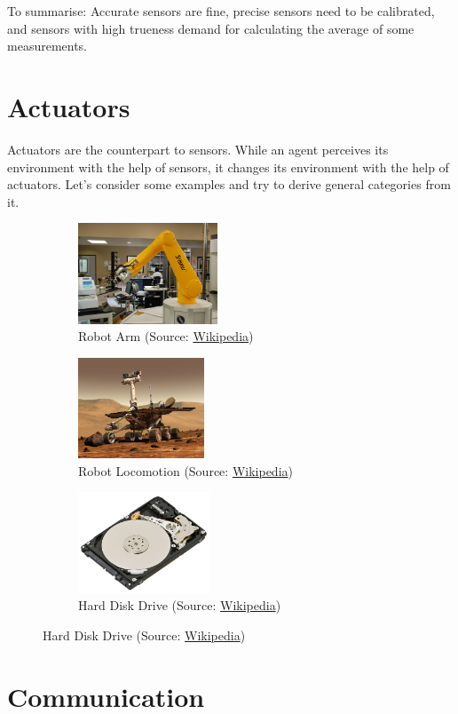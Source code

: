 To summarise: Accurate sensors are fine, precise sensors need to be calibrated, and sensors with high trueness demand for calculating the average of some measurements.

\section{Actuators}
\label{sec:actuators}

Actuators are the counterpart to sensors. While an agent perceives its environment with the help of sensors, it changes its environment with the help of actuators. Let's consider some examples and try to derive general categories from it.

\begin{figure}[htbp]
 \begin{subfigure}[b]{0.3\textwidth}
  \includegraphics[height=3cm]{pic/RobotArm.jpg}
  \caption{Robot Arm (Source: \href{https://en.wikipedia.org/wiki/File:CPCCG_screening_robot.jpg}{Wikipedia})}
  \label{sfig:robot_arm}
 \end{subfigure}
 \quad
 \begin{subfigure}[b]{0.3\textwidth}
  \includegraphics[height=3cm]{pic/RobotLocomotion.jpg}
  \caption{Robot Locomotion (Source: \href{https://en.wikipedia.org/wiki/Mars_Exploration_Rover\#/media/File:NASA_Mars_Rover.jpg}{Wikipedia})}
  \label{sfig:robot_locomotion}
 \end{subfigure}
 \quad
 \begin{subfigure}[b]{0.3\textwidth}
  \includegraphics[height=3cm]{pic/HDD.jpg}
  \caption{Hard Disk Drive (Source: \href{https://en.wikipedia.org/wiki/Hard_disk_drive\#/media/File:Laptop-hard-drive-exposed.jpg}{Wikipedia})}
  \label{sfig:robot_locomotion}
 \end{subfigure}
\end{figure}


\section{Communication}
\label{sec:communication}
